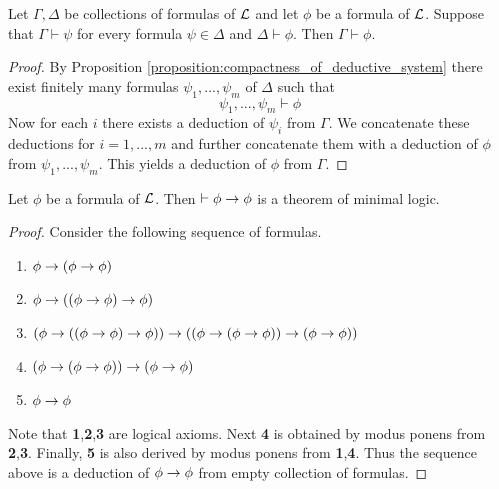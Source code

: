 \documentclass[10pt]{amsart}
\begin{document}
\begin{proposition}\label{proposition:transitivity_of_deductive_system}
	Let $\Gamma, \Delta$ be collections of formulas of ${\mathcal L}$ and let $\phi$ be a formula of ${\mathcal L}$. Suppose that $\Gamma \vdash \psi$ for every formula $\psi \in \Delta$ and $\Delta \vdash \phi$. Then $\Gamma \vdash \phi$.
\end{proposition}
\begin{proof}
	By Proposition \ref{proposition:compactness_of_deductive_system} there exist finitely many formulas $\psi_1,...,\psi_m$ of $\Delta$ such that
	$$\psi_1,...,\psi_m \vdash \phi$$
	Now for each $i$ there exists a deduction of $\psi_i$ from $\Gamma$. We concatenate these deductions for $i = 1,...,m$ and further concatenate them with a deduction of $\phi$ from $\psi_1,...,\psi_m$. This yields a deduction of $\phi$ from $\Gamma$.
\end{proof}

\begin{fact}\label{fact:identity_law_in_logic}
	Let $\phi$ be a formula of ${\mathcal L}$. Then $\vdash \phi \rightarrow \phi$ is a theorem of minimal logic.
\end{fact}
\begin{proof}
	Consider the following sequence of formulas.
	\begin{enumerate}[label=\textbf{\arabic*.}]
		\item $\phi \rightarrow (\phi \rightarrow \phi)$
		\item $\phi \rightarrow \left(\left(\phi \rightarrow \phi \right)\rightarrow \phi\right)$
		\item $\left(\phi \rightarrow \left(\left(\phi \rightarrow \phi \right)\rightarrow \phi\right)\right) \rightarrow \left(\left(\phi \rightarrow \left(\phi \rightarrow \phi\right)\right) \rightarrow \left(\phi \rightarrow \phi\right)\right)$
		\item $\left(\phi \rightarrow \left(\phi \rightarrow \phi\right)\right) \rightarrow \left(\phi \rightarrow \phi\right)$
		\item $\phi \rightarrow \phi$
	\end{enumerate}
	Note that \textbf{1},\textbf{2},\textbf{3} are logical axioms. Next \textbf{4} is obtained by modus ponens from \textbf{2},\textbf{3}. Finally, \textbf{5} is also derived by modus ponens from \textbf{1},\textbf{4}. Thus the sequence above is a deduction of $\phi \rightarrow \phi$ from empty collection of formulas.
\end{proof}
\end{document}
